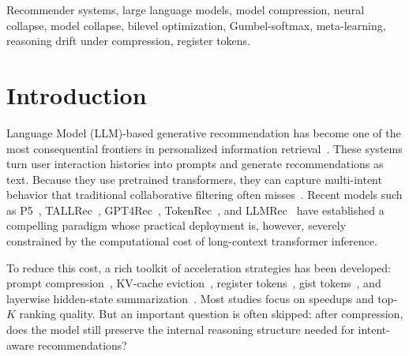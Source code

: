 \documentclass[lettersize,journal]{IEEEtran}
\begin{document}
\begin{IEEEkeywords}
Recommender systems, large language models, model compression,
neural collapse, model collapse, bilevel optimization, Gumbel-softmax,
meta-learning, reasoning drift under compression, register tokens.
\end{IEEEkeywords}


\section{Introduction}
\label{sec:intro}
 Language Model (LLM)-based generative
recommendation has become one of the most consequential
frontiers in personalized information retrieval~\cite{wu2024survey,lin2024survey}.
These systems turn user interaction histories into prompts and
generate recommendations as text.
Because they use pretrained transformers, they can capture
multi-intent behavior that traditional collaborative filtering
often misses~\cite{dai2023chatgpt,bao2023tallrec,geng2022p5}.
Recent models such as
P5~\cite{geng2022p5}, TALLRec~\cite{bao2023tallrec},
GPT4Rec~\cite{li2023gpt4rec}, TokenRec~\cite{qu2025tokenrec},
and LLMRec~\cite{wei2024llmrec} have established a compelling paradigm
whose practical deployment is, however, severely constrained
by the computational cost of long-context transformer inference.

To reduce this cost, a rich toolkit of acceleration strategies has
been developed: prompt compression~\cite{jiang2023longllmlingua},
KV-cache eviction~\cite{zhang2023h2o}, register tokens~\cite{darcet2024registers},
gist tokens~\cite{mu2023gist}, and layerwise hidden-state summarization~\cite{kim2024compressed}.
Most studies focus on speedups and top-$K$ ranking quality.
But an important question is often skipped: after compression,
does the model still preserve the internal reasoning structure
needed for intent-aware recommendations?
\end{document}
